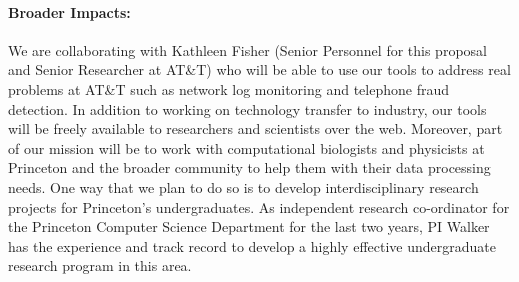 \paragraph*{Broader Impacts:}  We are collaborating with Kathleen Fisher
(Senior Personnel for this proposal and Senior Researcher at AT\&T)
who will be able to use our tools to address real problems at AT\&T such
as network log monitoring and 
telephone fraud detection.  
In addition to working on technology transfer to industry, 
our tools will be freely
available to researchers and scientists over the web.  Moreover, part
of our mission will be to work with computational biologists and
physicists at Princeton and the broader community to help them with
their data processing needs.  One way that we plan to do so is to
develop interdisciplinary research projects for Princeton's 
undergraduates.  As independent research co-ordinator for the Princeton
Computer Science Department
for the last two years, PI Walker has the experience and track record
to develop a highly effective undergraduate research program in this area.

